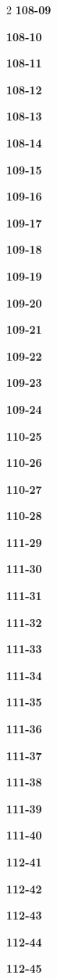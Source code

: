 \documentclass[10pt,a4paper]{article}
\begin{document}
\begin{multicols}{2}
\noindent\textbf{108-09}\ \par
\noindent\textbf{108-10}\ \par
\noindent\textbf{108-11}\ \par
\noindent\textbf{108-12}\ \par
\noindent\textbf{108-13}\ \par
\noindent\textbf{108-14}\ \par
\noindent\textbf{109-15}\ \par
\noindent\textbf{109-16}\ \par
\noindent\textbf{109-17}\ \par
\noindent\textbf{109-18}\ \par
\noindent\textbf{109-19}\ \par
\noindent\textbf{109-20}\ \par
\noindent\textbf{109-21}\ \par
\noindent\textbf{109-22}\ \par
\noindent\textbf{109-23}\ \par
\noindent\textbf{109-24}\ \par
\noindent\textbf{110-25}\ \par
\noindent\textbf{110-26}\ \par
\noindent\textbf{110-27}\ \par
\noindent\textbf{110-28}\ \par
\noindent\textbf{111-29}\ \par
\noindent\textbf{111-30}\ \par
\noindent\textbf{111-31}\ \par
\noindent\textbf{111-32}\ \par
\noindent\textbf{111-33}\ \par
\noindent\textbf{111-34}\ \par
\noindent\textbf{111-35}\ \par
\noindent\textbf{111-36}\ \par
\noindent\textbf{111-37}\ \par
\noindent\textbf{111-38}\ \par
\noindent\textbf{111-39}\ \par
\noindent\textbf{111-40}\ \par
\noindent\textbf{112-41}\ \par
\noindent\textbf{112-42}\ \par
\noindent\textbf{112-43}\ \par
\noindent\textbf{112-44}\ \par
\noindent\textbf{112-45}\ \par

\end{multicols}
\end{document}
